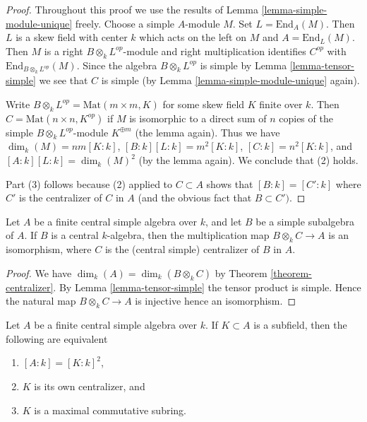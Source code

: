\begin{proof}
Throughout this proof we use the results of
Lemma \ref{lemma-simple-module-unique} freely.
Choose a simple $A$-module $M$. Set $L = \text{End}_A(M)$.
Then $L$ is a skew field with center $k$ which acts on the left on $M$
and $A = \text{End}_L(M)$.
Then $M$ is a right $B \otimes_k L^{op}$-module and
right multiplication identifies $C^{op}$ with
$\text{End}_{B \otimes_k L^{op}}(M)$.
Since the algebra $B \otimes_k L^{op}$ is simple by
Lemma \ref{lemma-tensor-simple} we see that $C$ is simple (by
Lemma \ref{lemma-simple-module-unique} again).

\medskip\noindent
Write $B \otimes_k L^{op} = \text{Mat}(m \times m, K)$ for some
skew field $K$ finite over $k$. Then $C = \text{Mat}(n \times n, K^{op})$
if $M$ is isomorphic to a direct sum of $n$ copies of the simple
$B \otimes_k L^{op}$-module $K^{\oplus m}$ (the lemma again). Thus we have
$\dim_k(M) = nm [K : k]$, $[B : k] [L : k] = m^2 [K : k]$,
$[C : k] = n^2 [K : k]$, and $[A : k] [L : k] = \dim_k(M)^2$ (by
the lemma again). We conclude that (2) holds.

\medskip\noindent
Part (3) follows because (2) applied to $C \subset A$ shows
that $[B : k] = [C' : k]$ where $C'$ is the centralizer of $C$ in $A$
(and the obvious fact that $B \subset C')$.
\end{proof}

\begin{lemma}
\label{lemma-when-tensor-is-equal}
Let $A$ be a finite central simple algebra over $k$, and let
$B$ be a simple subalgebra of $A$. If $B$ is a central
$k$-algebra, then the multiplication map $B \otimes_k C \to A$ is an isomorphism,
where $C$ is the (central simple)
centralizer of $B$ in $A$.
\end{lemma}

\begin{proof}
We have $\dim_k(A) = \dim_k(B \otimes_k C)$ by
Theorem \ref{theorem-centralizer}. By
Lemma \ref{lemma-tensor-simple}
the tensor product is simple. Hence the natural map
$B \otimes_k C \to A$ is injective hence an isomorphism.
\end{proof}

\begin{lemma}
\label{lemma-self-centralizing-subfield}
Let $A$ be a finite central simple algebra over $k$.
If $K \subset A$ is a subfield, then the following are equivalent
\begin{enumerate}
\item $[A : k] = [K : k]^2$,
\item $K$ is its own centralizer, and
\item $K$ is a maximal commutative subring.
\end{enumerate}
\end{lemma}

